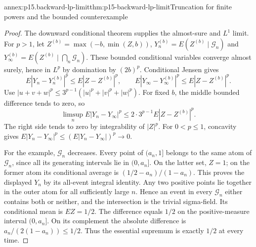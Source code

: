 \begin{annexitem}{annex:p15.backward-lp-limit}{thm:p15-backward-lp-limit}{Truncation for finite powers and the bounded counterexample}
\begin{proof}
The downward conditional theorem supplies the almost-sure and \(L^1\)
limit. For \(p>1\), let \(Z^{(b)}=\max(-b,\min(Z,b))\),
\(Y_n^{(b)}=E(Z^{(b)}\mid\mathcal G_n)\) and
\(Y_\infty^{(b)}=E(Z^{(b)}\mid\bigcap_n\mathcal G_n)\).
These bounded conditional variables converge almost surely, hence
in \(L^p\) by domination by \((2b)^p\).
Conditional Jensen gives
\[
 E|Y_n-Y_n^{(b)}|^p\leq E|Z-Z^{(b)}|^p,
 \qquad
 E|Y_\infty-Y_\infty^{(b)}|^p\leq E|Z-Z^{(b)}|^p .
\]
Use \(|u+v+w|^p\leq3^{p-1}(|u|^p+|v|^p+|w|^p)\).
For fixed \(b\), the middle bounded difference tends to zero, so
\[
 \limsup_n E|Y_n-Y_\infty|^p
                     \leq2\cdot3^{p-1}E|Z-Z^{(b)}|^p.
\]
The right side tends to zero by integrability of \(|Z|^p\).
For \(0<p\leq1\), concavity gives
\(E|Y_n-Y_\infty|^p\leq(E|Y_n-Y_\infty|)^p\to0\).

For the example, \(\mathcal G_n\) decreases.
Every point of \((a_n,1]\) belongs to the same atom of
\(\mathcal G_n\), since all its generating intervals lie in
\((0,a_n]\). On the latter set, \(Z=1\); on the former atom
its conditional average is
\((1/2-a_n)/(1-a_n)\). This proves the displayed \(Y_n\)
by its all-event integral identity.
Any two positive points lie together in the outer atom for all
sufficiently large \(n\). Hence an event in every \(\mathcal G_n\)
either contains both or neither, and the intersection is the trivial
sigma-field. Its conditional mean is \(EZ=1/2\).
The difference equals \(1/2\) on the positive-measure interval
\((0,a_n]\). On its complement the absolute difference is
\(a_n/(2(1-a_n))\leq1/2\).
Thus the essential supremum is exactly \(1/2\) at every time.
\end{proof}
\end{annexitem}

